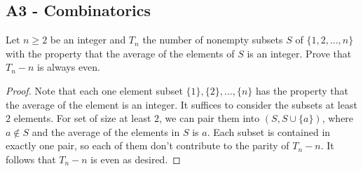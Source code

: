 \documentclass[11pt]{scrartcl}
\newcommand{\<}{\langle}
\renewcommand{\>}{\rangle}
\begin{document}
\subsection{A3 - Combinatorics}
Let $n \ge 2$ be an integer and $T_n$ the number of nonempty subsets $S$ of $\{1, 2, \dots, n\}$ with the property that the average of the elements of $S$ is an integer.  Prove that $T_n - n$ is always even.  
\begin{proof}
Note that each one element subset $\{1\}, \{2\}, \dots, \{n\}$ has the property that the average of the element is an integer.  It suffices to consider the subsets at least $2$ elements.  For set of size at least $2$, we can pair them into $(S, S \cup\{a\})$, where $a \not \in S$ and the average of the elements in $S$ is $a$.  Each subset is contained in exactly one pair, so each of them don't contribute to the parity of $T_n - n$.  It follows that $T_n - n$ is even as desired.  
\end{proof}

\pagebreak
\end{document}
